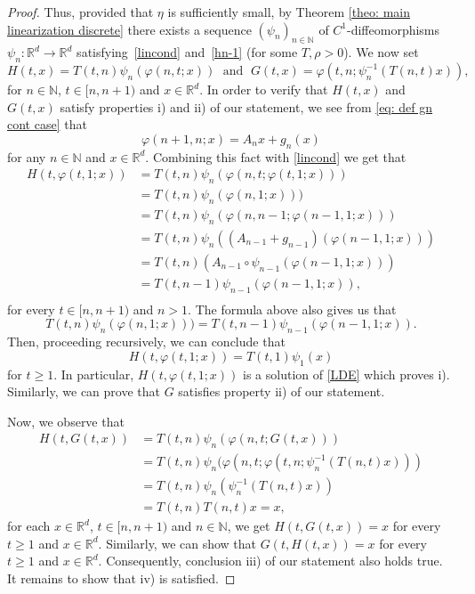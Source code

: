 \documentclass[10pt,a4paper]{amsart}
\def\N{\mathbb{N}}
\def\R{\mathbb{R}}
\renewcommand{\phi}{\varphi}
\begin{document}
\begin{proof}
Thus, provided that $\eta$ is sufficiently small, by Theorem \ref{theo: main linearization discrete} there exists  a sequence $(\psi_n)_{n\in \N}$ of $C^1$-diffeomorphisms $\psi_n \colon \R^d \to \R^d$ satisfying~\eqref{lincond} and~\eqref{hn-1} (for some $T, \rho >0$).
We now set 
\begin{equation}\label{eq: def of H and G}
    H(t,x)=T(t,n) \psi_n (\phi(n, t;x)) \; \text{ and }\;  G(t,x)=\phi(t, n; \psi_n^{-1}(T(n,t)x)),
\end{equation}
for $n\in \N$, $t\in [n, n+1)$ and $x\in \R^d$. In order to verify that $H(t,x)$ and $G(t,x)$ satisfy properties i) and ii) of our statement, we see from \eqref{eq: def gn cont case} that 
\[
\varphi(n+1,n;x)=A_nx+g_n(x)
\]
for any $n\in \N$ and $x\in \R^d$.
Combining this fact with \eqref{lincond} we get that
\[ 
\begin{split}
H(t,\varphi(t,1;x))&=T(t,n) \psi_n (\phi(n, t;\varphi(t,1;x)))\\
&=T(t,n) \psi_n (\phi(n, 1;x)))\\
&=T(t,n) \psi_n (\phi(n,n-1; \varphi(n-1,1;x)))\\
&=T(t,n) \psi_n ((A_{n-1}+g_{n-1})(\varphi(n-1,1;x)))\\
&=T(t,n) (A_{n-1} \circ \psi_{n-1} (\varphi(n-1,1;x)))\\
&=T(t,n-1) \psi_{n-1} (\varphi(n-1,1;x)),\\
\end{split}
\]
for every $t\in[n,n+1)$ and  $n>1$. The formula above also gives us that 
\[
T(t,n) \psi_n (\phi(n, 1;x)))=
T(t,n-1) \psi_{n-1} (\varphi(n-1,1;x)).
\]
Then, proceeding recursively, we can conclude that 
\[
H(t,\varphi(t,1;x))=T(t,1) \psi_{1} (x) 
\]
for $t\geq 1$. In particular, $H(t,\varphi(t,1;x))$ is a solution of \eqref{LDE} which proves i). Similarly, we can prove that $G$ satisfies property ii) of our statement. 

Now, we observe that
\[
\begin{split}
H(t, G(t, x)) &=T(t, n)\psi_n(\phi(n, t; G(t,x))) \\
&=T(t,n)\psi_n (\phi(n, t; \phi(t, n;\psi_n^{-1}(T(n, t)x)) ) \\
&=T(t,n)\psi_n (\psi_n^{-1}(T(n,t)x)) \\
&=T(t,n)T(n, t)x =x,
\end{split}
\]
for each $x\in \R^d$, $t\in [n, n+1)$ and $n\in \N$, we get $H(t, G(t, x))=x$ for every $t\geq 1$ and $x\in \R^d$. Similarly, we can show that $G(t, H(t, x))=x$ for every $t\geq 1$ and $x\in \R^d$. Consequently, conclusion iii) of our statement also holds true. It remains to show that iv) is satisfied. 


\end{proof}
\end{document}
